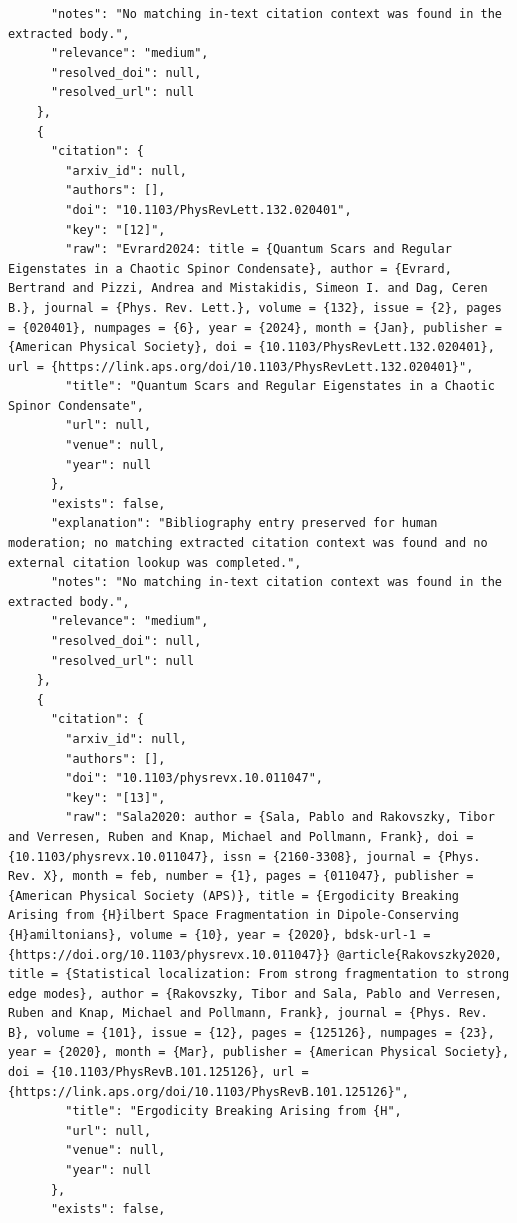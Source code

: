 \documentclass[11pt]{article}
\begin{document}
\begin{verbatim}
      "notes": "No matching in-text citation context was found in the extracted body.",
      "relevance": "medium",
      "resolved_doi": null,
      "resolved_url": null
    },
    {
      "citation": {
        "arxiv_id": null,
        "authors": [],
        "doi": "10.1103/PhysRevLett.132.020401",
        "key": "[12]",
        "raw": "Evrard2024: title = {Quantum Scars and Regular Eigenstates in a Chaotic Spinor Condensate}, author = {Evrard, Bertrand and Pizzi, Andrea and Mistakidis, Simeon I. and Dag, Ceren B.}, journal = {Phys. Rev. Lett.}, volume = {132}, issue = {2}, pages = {020401}, numpages = {6}, year = {2024}, month = {Jan}, publisher = {American Physical Society}, doi = {10.1103/PhysRevLett.132.020401}, url = {https://link.aps.org/doi/10.1103/PhysRevLett.132.020401}",
        "title": "Quantum Scars and Regular Eigenstates in a Chaotic Spinor Condensate",
        "url": null,
        "venue": null,
        "year": null
      },
      "exists": false,
      "explanation": "Bibliography entry preserved for human moderation; no matching extracted citation context was found and no external citation lookup was completed.",
      "notes": "No matching in-text citation context was found in the extracted body.",
      "relevance": "medium",
      "resolved_doi": null,
      "resolved_url": null
    },
    {
      "citation": {
        "arxiv_id": null,
        "authors": [],
        "doi": "10.1103/physrevx.10.011047",
        "key": "[13]",
        "raw": "Sala2020: author = {Sala, Pablo and Rakovszky, Tibor and Verresen, Ruben and Knap, Michael and Pollmann, Frank}, doi = {10.1103/physrevx.10.011047}, issn = {2160-3308}, journal = {Phys. Rev. X}, month = feb, number = {1}, pages = {011047}, publisher = {American Physical Society (APS)}, title = {Ergodicity Breaking Arising from {H}ilbert Space Fragmentation in Dipole-Conserving {H}amiltonians}, volume = {10}, year = {2020}, bdsk-url-1 = {https://doi.org/10.1103/physrevx.10.011047}} @article{Rakovszky2020, title = {Statistical localization: From strong fragmentation to strong edge modes}, author = {Rakovszky, Tibor and Sala, Pablo and Verresen, Ruben and Knap, Michael and Pollmann, Frank}, journal = {Phys. Rev. B}, volume = {101}, issue = {12}, pages = {125126}, numpages = {23}, year = {2020}, month = {Mar}, publisher = {American Physical Society}, doi = {10.1103/PhysRevB.101.125126}, url = {https://link.aps.org/doi/10.1103/PhysRevB.101.125126}",
        "title": "Ergodicity Breaking Arising from {H",
        "url": null,
        "venue": null,
        "year": null
      },
      "exists": false,

\end{verbatim}
\end{document}
